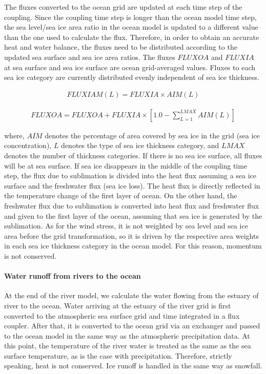 The fluxes converted to the ocean grid are updated at each time step of
the coupling. Since the coupling time step is longer than the ocean
model time step, the sea level/sea ice area ratio in the ocean model is
updated to a different value than the one used to calculate the flux.
Therefore, in order to obtain an accurate heat and water balance, the
fluxes need to be distributed according to the updated sea surface and
sea ice area ratios. The fluxes \(FLUXOA\) and \(FLUXIA\) at sea surface
and sea ice surface are ocean grid-averaged values. Fluxes to each sea
ice category are currently distributed evenly independent of sea ice
thickness.

\begin{eqnarray} FLUXIAM(L)=FLUXIA \times AIM(L)\end{eqnarray}

\begin{eqnarray} FLUXOA=FLUXOA+FLUXIA \times [1.0-\sum_{L=1}^{LMAX}AIM(L)]\end{eqnarray}

where, \(AIM\) denotes the percentage of area covered by sea ice in the
grid (sea ice concentration), \(L\) denotes the type of sea ice
thickness category, and \(LMAX\) denotes the number of thickness
categories. If there is no sea ice surface, all fluxes will be at sea
surface. If sea ice disappears in the middle of the coupling time step,
the flux due to sublimation is divided into the heat flux assuming a sea
ice surface and the freshwater flux (sea ice loss). The heat flux is
directly reflected in the temperature change of the first layer of
ocean. On the other hand, the freshwater flux due to sublimation is
converted into heat flux and freshwater flux and given to the first
layer of the ocean, assuming that sea ice is generated by the
sublimation. As for the wind stress, it is not weighted by sea level and
sea ice area before the grid transformation, so it is driven by the
respective area weights in each sea ice thickness category in the ocean
model. For this reason, momentum is not conserved.

\hypertarget{water-runoff-from-rivers-to-the-ocean}{%
\paragraph{Water runoff from rivers to the
ocean}\label{water-runoff-from-rivers-to-the-ocean}}

At the end of the river model, we calculate the water flowing from the
estuary of river to the ocean. Water arriving at the estuary of the
river grid is first converted to the atmospheric sea surface grid and
time integrated in a flux coupler. After that, it is converted to the
ocean grid via an exchanger and passed to the ocean model in the same
way as the atmospheric precipitation data. At this point, the
temperature of the river water is treated as the same as the sea surface
temperature, as is the case with precipitation. Therefore, strictly
speaking, heat is not conserved. Ice runoff is handled in the same way
as snowfall.

